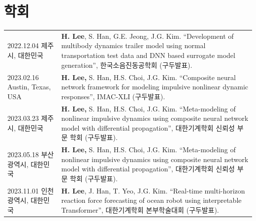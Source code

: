 \documentclass[a4paper,10pt]{extarticle}
\begin{document}
\section*{학회}
\noindent
{}
\vspace*{-.5cm}
\begin{longtable}{LR}
    {2022.12.04 \linebreak 제주시, 대한민국}           & \textbf{H. Lee}, S. Han, G.E. Jeong, J.G. Kim. “Development of multibody dynamics trailer model using normal transportation test data and DNN based surrogate model generation”, 한국소음진동공학회 (구두발표). \\
    {2023.02.16 \linebreak  Austin, Texas, USA} & \textbf{H. Lee,} S. Han, H.S. Choi, J.G. Kim. “Composite neural network framework for modeling impulsive nonlinear dynamic responses”, IMAC-XLI (구두발표).                                            \\
    {2023.03.23 \linebreak 제주시, 대한민국}           & \textbf{H. Lee,} S. Han, H.S. Choi, J.G. Kim. “Meta-modeling of nonlinear impulsive dynamics using composite neural network model with differential propagation”, 대한기계학회 신뢰성 부문 학회 (구두발표).         \\
    {2023.05.18 \linebreak 부산광역시, 대한민국}         & \textbf{H. Lee,} S. Han, H.S. Choi, J.G. Kim. “Meta-modeling of nonlinear impulsive dynamics using composite neural network model with differential propagation”, 대한기계학회 신뢰성 부문 학회 (구두발표).         \\
    {2023.11.01 \linebreak 인천광역시, 대한민국}         & \textbf{H. Lee}, J. Han, T. Yeo, J.G. Kim. “Real-time multi-horizon reaction force forecasting of ocean robot using interpretable Transformer”,  대한기계학회 본부학술대회 (구두발표).                             \\
\end{longtable}


\end{document}
